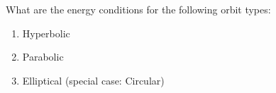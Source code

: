 

\vspace*{\fill}
\centering

What are the energy conditions for the following orbit types:
\begin{enumerate}
    \item Hyperbolic
    \item Parabolic
    \item Elliptical (special case: Circular)
\end{enumerate}

\centering
\vspace*{\fill}

